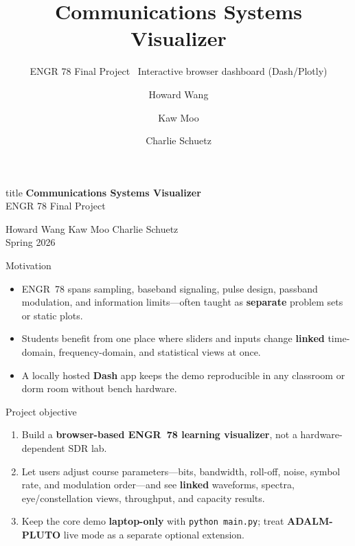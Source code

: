 \documentclass[aspectratio=169, 12pt]{beamer}
\title{Communications Systems Visualizer}
\subtitle{ENGR 78 Final Project \textemdash\ Interactive browser dashboard (Dash/Plotly)}
\author[Wang, Moo, Schuetz]{Howard Wang \and Kaw Moo \and Charlie Schuetz}
\institute{ENGR 78 \textbullet\ Spring 2026}
\begin{document}
\begin{frame}[plain]
\vspace{0.95cm}
\begin{center}
\begin{beamercolorbox}[wd=0.88\linewidth,sep=0.38cm,center,rounded=true,shadow=false]{title}
{\LARGE\bfseries Communications Systems Visualizer}\\[0.3cm]
{\normalsize ENGR 78 Final Project}
\end{beamercolorbox}
\vspace{0.75cm}
{\large Howard Wang \quad Kaw Moo \quad Charlie Schuetz}\\[0.45cm]
{\normalsize\color{SlideMuted}Spring 2026}
\end{center}
\end{frame}

\begin{frame}{Motivation}
\begin{itemize}
    \item ENGR~78 spans sampling, baseband signaling, pulse design, passband modulation, and information limits---often taught as \textbf{separate} problem sets or static plots.
    \item Students benefit from \alert{one place} where sliders and inputs change \textbf{linked} time-domain, frequency-domain, and statistical views at once.
    \item A locally hosted \textbf{Dash} app keeps the demo reproducible in any classroom or dorm room without bench hardware.
\end{itemize}
\end{frame}

\begin{frame}{Project objective}
\begin{enumerate}
    \item Build a \textbf{browser-based ENGR~78 learning visualizer}, not a hardware-dependent SDR lab.
    \item Let users adjust course parameters---bits, bandwidth, roll-off, noise, symbol rate, and modulation order---and see \textbf{linked} waveforms, spectra, eye/constellation views, throughput, and capacity results.
    \item Keep the core demo \textbf{laptop-only} with \texttt{python main.py}; treat \textbf{ADALM-PLUTO} live mode as a separate optional extension.
\end{enumerate}
\end{frame}
\end{document}
